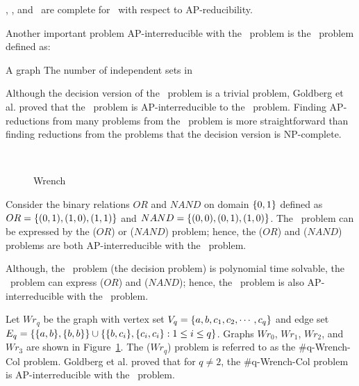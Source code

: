 \begin{cor}
\csat, \ctsat, and \ctcol\ are complete for \cp\ with respect to AP-reducibility.
\end{cor}

Another important problem AP-interreducible with the \csat\ problem is the \cis\ problem defined as:

\pnndef%
{A graph \mG}
{The number of independent sets in \mG}

Although the decision version of the \cis\ problem is a trivial problem, Goldberg et al.
\cite{Leslie03} proved that the \cis\ problem is AP-interreducible to the \csat\ problem. 
Finding AP-reductions from many problems from the \cis\ problem is more straightforward than
finding reductions from the problems that the decision version is NP-complete.

\begin{figure}[h]
\subfigure[\(Wr_0\)]{\label{fig:Wr0}}\hspace{4.78cm}
\subfigure[\(Wr_1\)]{\label{fig:Wr1}}\\
\subfigure[\(Wr_2\)]{\label{fig:Wr2}}\hspace{4cm}
\subfigure[\(Wr_3\)]{\label{fig:Wr3}}
\caption{Wrench}
\label{fig:wrench}
\end{figure}

\begin{example}
Consider the binary relations \(OR\) and \(NAND\) on domain \(\{{{0,1}}\}\) defined as
\(OR=\{{(0,1),(1,0),(1,1)}\}\) and \(NAND=\{{(0,0),(0,1),(1,0)}\}\)\@.
The \cis\ problem can be expressed by the \ccsp(\(OR\)) or \ccsp(\(NAND\)) problem;
hence, the \ccsp(\(OR\)) and \ccsp(\(NAND\)) problems are both AP-interreducible with the
\csat\ problem.

Although, the \dsat\ problem (the decision problem) is polynomial time
solvable, the \cdsat\ problem can express \ccsp(\(OR\)) and
\ccsp(\(NAND\)); hence, the \cdsat\ problem 
is also AP-interreducible with the \csat\ problem.
\end{example}

\begin{example} \label{exm:wrench}
Let \(Wr_q\) be the graph with vertex set \(V_q=\{{a,b,c_1,c_2,\cdots,c_q}\}\)
and edge set \(E_q=\{{\{{a,b}\},\{{b,b}\}}\} \cup 
\{{\{{b,c_i}\},\{{c_i,c_i}\}:1\le i\le q}\}\)\@.
Graphs \(Wr_0\), \(Wr_1\), \(Wr_2\), and \(Wr_3\) are shown in Figure~\ref{fig:wrench}.
The \chom(\(Wr_q\)) problem is referred to as the \#q-{\sc Wrench-Col} problem. 
Goldberg et al. \cite{Leslie03} proved that for \(q\neq 2\), the  \#q-{\sc Wrench-Col} problem
is AP-interreducible with the \csat\ problem.
\end{example}

